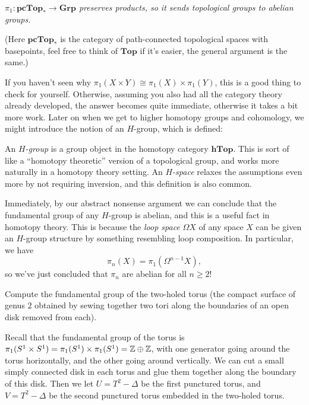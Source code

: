 \begin{solution}
    \begin{center}
        \emph{$\pi_1 : \mathbf{pcTop_*} \to \mathbf{Grp}$ preserves products, so it sends topological groups to abelian groups.}
    \end{center}

    (Here $\mathbf{pcTop_*}$ is the category of path-connected topological spaces with basepoints, feel free to think of $\mathbf{Top}$ if it's easier, the general argument is the same.)

    \medskip
    If you haven't seen why $\pi_1(X\times Y)\cong \pi_1(X)\times \pi_1(Y)$, this is a good thing to check for yourself. Otherwise, assuming you also had all the category theory already developed, the answer becomes quite immediate, otherwise it takes a bit more work. Later on when we get to higher homotopy groups and cohomology, we might introduce the notion of an $H$-group, which is defined:

    \begin{definition}
        An \emph{$H$-group} is a group object in the homotopy category $\textbf{hTop}$. This is sort of like a ``homotopy theoretic'' version of a topological group, and works more naturally in a homotopy theory setting. An \emph{$H$-space} relaxes the assumptions even more by not requiring inversion, and this definition is also common.
    \end{definition}

    Immediately, by our abstract nonsense argument we can conclude that the fundamental group of any $H$-group is abelian, and this is a useful fact in homotopy theory. This is because the \emph{loop space} $\Omega X$ of any space $X$ can be given an $H$-group structure by something resembling loop composition. In particular, we have
    \[\pi_n(X) = \pi_1(\Omega^{n-1} X),\]
    so we've just concluded that $\pi_n$ are abelian for all $n\geq 2$!
\end{solution}

\begin{problem}{2.1}
    Compute the fundamental group of the two-holed torus (the compact surface of genus $2$ obtained by sewing together two tori along the boundaries of an open disk removed from each).
\end{problem}

Recall that the fundamental group of the torus is $\pi_1(S^1\times S^1) = \pi_1(S^1)\times \pi_1(S^1) = \mathbb{Z}\oplus \mathbb{Z}$, with one generator going around the torus horizontally, and the other going around vertically. We can cut a small simply connected disk in each torus and glue them together along the boundary of this disk. Then we let $U = T^2-\Delta$ be the first punctured torus, and $V = T^2-\Delta$ be the second punctured torus embedded in the two-holed torus.

